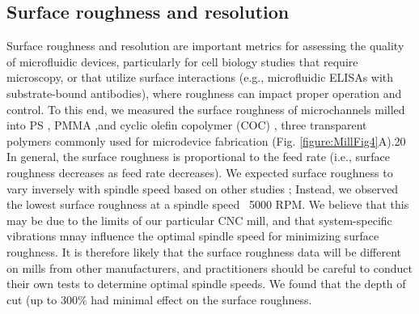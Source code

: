 {\subsection{Surface roughness and resolution}
Surface roughness and resolution are important metrics for assessing the quality of microfluidic devices, particularly for cell biology studies that require microscopy, or that utilize surface interactions (e.g., microfluidic ELISAs with substrate-bound antibodies), where roughness can impact proper operation and control. To this end, we measured the surface roughness of microchannels milled into PS \cite{Young2011, Chen2008a}, PMMA \cite{Wabuyele2001, Klank2002},and cyclic olefin copolymer (COC) \cite{Steigert2007}, three transparent polymers commonly used for microdevice fabrication (Fig. \ref{figure:MillFig4}A).20 In general, the surface roughness is proportional to the feed rate (i.e., surface roughness decreases as feed rate decreases). We expected surface roughness to vary inversely with spindle speed based on other studies \cite{Kiswanto2014}; Instead, we observed the lowest surface roughness at a spindle speed ~5000 RPM. We believe that this may be due to the limits of our particular CNC mill, and that system-specific vibrations \cite{Zhang2007} mnay influence the optimal spindle speed for minimizing surface roughness. It is therefore likely that the surface roughness data will be different on mills from other manufacturers, and practitioners should be careful to conduct their own tests to determine optimal spindle speeds. We found that the depth of cut (up to 300\% had minimal effect on the surface roughness.

}
